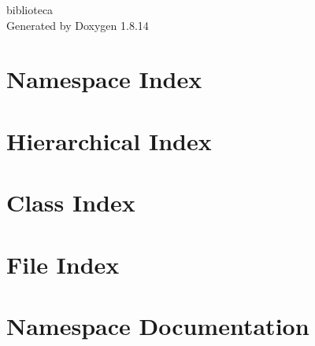 \documentclass[twoside]{book}
\newcommand{\+}{\discretionary{\mbox{\scriptsize$\hookleftarrow$}}{}{}}
\newcommand{\clearemptydoublepage}{%
  \newpage{\pagestyle{empty}\cleardoublepage}%
}
\begin{document}
\hypersetup{pageanchor=false,
             bookmarksnumbered=true,
             pdfencoding=unicode
            }
\begin{titlepage}
\vspace*{7cm}
\begin{center}%
{\Large biblioteca }\\
\vspace*{1cm}
{\large Generated by Doxygen 1.8.14}\\
\end{center}
\end{titlepage}
\clearemptydoublepage
{}
\tableofcontents
\clearemptydoublepage
{}
\hypersetup{pageanchor=true}

\chapter{Namespace Index}

\chapter{Hierarchical Index}

\chapter{Class Index}

\chapter{File Index}

\chapter{Namespace Documentation}











\end{document}
